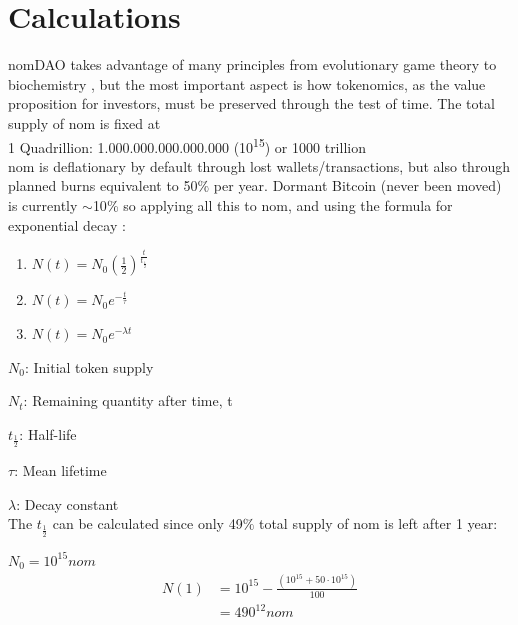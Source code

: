 \documentclass[12pt]{article}
\begin{document}
\section*{Calculations}

nomDAO takes advantage of many principles from evolutionary game theory \cite{game} to biochemistry \cite{menten}, but the most important aspect is how tokenomics, as the value proposition for investors, must be preserved through the test of time. The total supply of nom is fixed at\\

1 Quadrillion: 1.000.000.000.000.000 (10\textsuperscript{15}) or 1000 trillion \\

nom is deflationary by default through lost wallets/transactions, but also through planned burns equivalent to 50$\%$ per year. Dormant Bitcoin (never been moved) is currently $\sim$10{\%} \cite{btc} so applying all this to nom, and using the formula for exponential decay \cite{decay}: 


\begin{enumerate}[label=(\roman*)]

\item $N(t)=N_{0}(\frac{1}{2})^\frac{t}{t_{\frac{1}{2}}}$

\item  $N(t)=N_{0}e^{-\frac{t}{\tau}}$

\item  $N(t)=N_{0}e^{-\lambda t}$

\end{enumerate}

$N_{0}$: Initial token supply

$N_{t}$: Remaining quantity after time, t

${t_{\frac{1}{2}}}$: Half-life

$\tau$: Mean lifetime

$\lambda$: Decay constant\\

The ${t_{\frac{1}{2}}}$ can be calculated since only 49$\%$ total supply of nom is left after 1 year:

$N_{0} = 10^{15} nom$\\

\begin{equation}\label{init}
\begin{split}
 N(1) &= 10^{15} - \frac{(10^{15} + 50\cdot 10^{15})}{100}\\
 &= 490^{12} nom
\end{split}
\end{equation}
\end{document}
